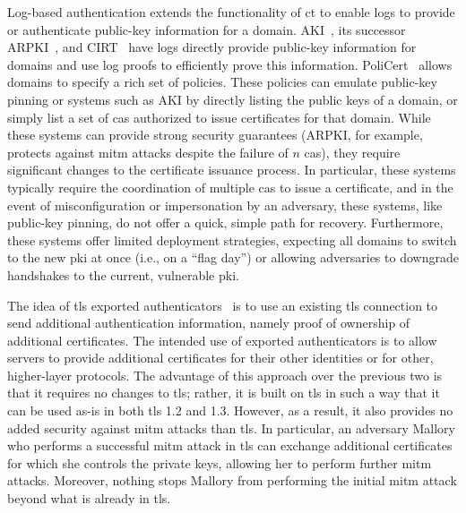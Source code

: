 Log-based authentication extends the functionality of \ac{ct} to enable logs to
provide or authenticate public-key information for a domain.
AKI~\cite{kim2013accountable}, its successor ARPKI~\cite{basin2014arpki}, and
CIRT~\cite{ryan2014enhanced} have logs directly provide public-key information
for domains and use log proofs to efficiently prove this information.
PoliCert~\cite{szalachowski2014policert} allows domains to specify a rich set of
policies. These policies can emulate public-key pinning or systems such as AKI
by directly listing the public keys of a domain, or simply list a set of
\acp{ca} authorized to issue certificates for that domain. While these systems
can provide strong security guarantees (ARPKI, for example, protects against
\ac{mitm} attacks despite the failure of $n$ \acp{ca}), they require significant
changes to the certificate issuance process. In particular, these systems
typically require the coordination of multiple \acp{ca} to issue a certificate, and in
the event of misconfiguration or impersonation by an adversary, these systems,
like public-key pinning, do not offer a quick, simple path for recovery.
Furthermore, these systems offer limited deployment strategies, expecting all
domains to switch to the new \ac{pki} at once (i.e., on a ``flag day'') or allowing adversaries to
downgrade handshakes to the current, vulnerable \ac{pki}.

The idea of \ac{tls} exported authenticators~\cite{rfc-extra-cert-1,
rfc-extra-cert-2} is to use an existing \ac{tls} connection to send additional
authentication information, namely proof of ownership of additional
certificates. The intended use of exported authenticators is to allow servers to
provide additional certificates for their other identities or for other,
higher-layer protocols. The advantage of this approach over the previous two is
that it requires no changes to \ac{tls}; rather, it is built on \ac{tls} in such
a way that it can be used as-is in both \ac{tls} 1.2 and 1.3. However, as a
result, it also provides no added security against \ac{mitm} attacks than
\ac{tls}. In particular, an adversary Mallory who performs a successful
\ac{mitm} attack in \ac{tls} can exchange additional certificates for which she
controls the private keys, allowing her to perform further \ac{mitm} attacks.
Moreover, nothing stops Mallory from performing the initial \ac{mitm} attack
beyond what is already in \ac{tls}.



